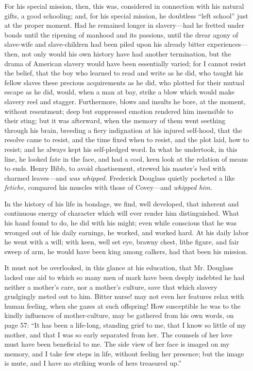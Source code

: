 For his special mission, then, this was, considered in connection with
his natural gifts, a good schooling; and, for his special mission, he
doubtless ``left school'' just at the proper moment. Had he remained
longer in slavery---had he fretted under bonds until the ripening of
manhood and its passions, until the drear agony of slave-wife and
slave-children had been piled upon his already bitter
experiences---then, not only would his own history have had another
termination, but the drama of American slavery would have been
essentially varied; for I cannot resist the belief, that the boy who
learned to read and write as he did, who taught his fellow slaves these
precious acquirements as he did, who plotted for their mutual escape as
he did, would, when a man at bay, strike a blow which would make slavery
reel and stagger. Furthermore, blows and insults he bore, at the moment,
without resentment; deep but suppressed emotion rendered him insensible
to their sting; but it was afterward, when the memory of them went
seething through his brain, breeding a fiery indignation at his injured
self-hood, that the resolve came to resist, and the time fixed when to
resist, and {}the plot laid, how to resist; and he always kept his
self-pledged word. In what he undertook, in this line, he looked fate in
the face, and had a cool, keen look at the relation of means to ends.
Henry Bibb, to avoid chastisement, strewed his master's bed with charmed
leaves---and \emph{was whipped.} Frederick Douglass quietly pocketed a
like \emph{fetiche,} compared his muscles with those of Covey---and
\emph{whipped him.}

In the history of his life in bondage, we find, well developed, that
inherent and continuous energy of character which will ever render him
distinguished. What his hand found to do, he did with his might; even
while conscious that he was wronged out of his daily earnings, he
worked, and worked hard. At his daily labor he went with a will; with
keen, well set eye, brawny chest, lithe figure, and fair sweep of arm,
he would have been king among calkers, had that been his mission.

It must not be overlooked, in this glance at his education, that Mr.
Douglass lacked one aid to which so many men of mark have been deeply
indebted he had neither a mother's care, nor a mother's culture, save
that which slavery grudgingly meted out to him. Bitter nurse! may not
even her features relax with human feeling, when she gazes at such
offspring! How susceptible he was to the kindly influences of
mother-culture, may be gathered from his own words, on page 57: ``It has
been a life-long, standing grief to me, that I know so little of my
mother, and that I was so early separated from her. The counsels of her
love must have been beneficial to me. The side view of her face is
imaged on my memory, and I take few steps in life, without feeling her
presence; but the image is mute, and I have no striking words of hers
treasured up.''

